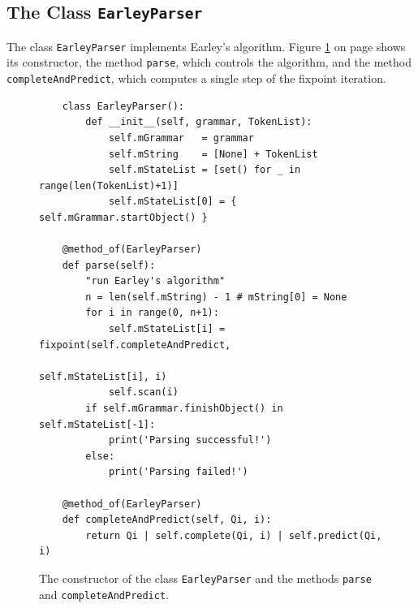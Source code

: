 \subsection{The Class \texttt{EarleyParser}}
The class \texttt{EarleyParser} implements Earley's algorithm.  Figure
\ref{fig:01-Earley-Parser.ipynb:EarleyParser} on page \pageref{fig:01-Earley-Parser.ipynb:EarleyParser}
shows its constructor, the method \texttt{parse}, which controls the algorithm, and the method
\texttt{completeAndPredict}, which computes a single step of the fixpoint iteration.

\begin{figure}[!ht]
\centering
\begin{verbatim}
    class EarleyParser():
        def __init__(self, grammar, TokenList):
            self.mGrammar   = grammar
            self.mString    = [None] + TokenList
            self.mStateList = [set() for _ in range(len(TokenList)+1)]
            self.mStateList[0] = { self.mGrammar.startObject() }

    @method_of(EarleyParser)
    def parse(self):
        "run Earley's algorithm"
        n = len(self.mString) - 1 # mString[0] = None
        for i in range(0, n+1):
            self.mStateList[i] = fixpoint(self.completeAndPredict,
                                          self.mStateList[i], i)
            self.scan(i)
        if self.mGrammar.finishObject() in self.mStateList[-1]:
            print('Parsing successful!')
        else:
            print('Parsing failed!')

    @method_of(EarleyParser)
    def completeAndPredict(self, Qi, i):
        return Qi | self.complete(Qi, i) | self.predict(Qi, i)
\end{verbatim}
\vspace*{-0.3cm}
\caption{The constructor of the class \texttt{EarleyParser} and the methods \texttt{parse} and
  \texttt{completeAndPredict}.}
\label{fig:01-Earley-Parser.ipynb:EarleyParser}
\end{figure}

